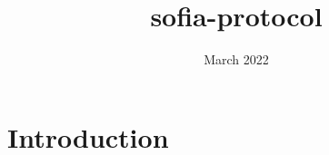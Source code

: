 \documentclass{article}
\title{sofia-protocol}
\author{ }
\date{March 2022}
\begin{document}
\maketitle

\section{Introduction}
\end{document}

